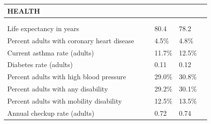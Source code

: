 \documentclass[9pt]{report}
\begin{document}
\newpage
\setlength{\tabcolsep}{.01in} %
\begin{tabular}{p{.10in}p{.10in}p{.10in}p{3.7in}>{\hfill}p{.85in}>{\hfill}p{.85in}>{\hfill}p{.85in}>{\hfill}p{.85in}p{0.1in}}
\multicolumn{9}{l}{\parbox{7.1in}{\raggedright{\large{\strut\textbf{HEALTH}\strut}}}} \\ 
\hline
\multicolumn{4}{l}{\parbox{3.5in}{\raggedright{\textbf{}}}} & \multicolumn{1}{r}{\parbox{.85in}{\strut\raggedleft{\textbf{}\strut}}} & \multicolumn{1}{r}{\parbox{.85in}{\strut\raggedleft{\textbf{}\strut}}} & \multicolumn{1}{r}{\parbox{.85in}{\strut{}}} & \multicolumn{1}{r}{\parbox{.85in}{\strut{}}} & \\ 
\multicolumn{9}{l}{} \\ 
\multicolumn{4}{l}{\parbox{3.6in}{\strut\raggedright{{Life expectancy in years}}\strut}} &  &  & 80.4 & 78.2 & \multicolumn{1}{l}{}  \\ 
\multicolumn{4}{l}{\parbox{3.6in}{\strut\raggedright{{Percent adults with coronary heart disease}}\strut}} &  &  & 4.5\% & 4.8\% & \multicolumn{1}{l}{}  \\ 
\multicolumn{4}{l}{\parbox{3.6in}{\strut\raggedright{{Current asthma rate (adults)}}\strut}} &  &  & 11.7\% & 12.5\% & \multicolumn{1}{l}{}  \\ 
\multicolumn{4}{l}{\parbox{3.6in}{\strut\raggedright{{Diabetes rate (adults)}}\strut}} &  &  & 0.11 & 0.12 & \multicolumn{1}{l}{}  \\ 
\multicolumn{4}{l}{\parbox{3.6in}{\strut\raggedright{{Percent adults with high blood pressure}}\strut}} &  &  & 29.0\% & 30.8\% & \multicolumn{1}{l}{}  \\ 
\multicolumn{4}{l}{\parbox{3.6in}{\strut\raggedright{{Percent adults with any disability}}\strut}} &  &  & 29.2\% & 30.1\% & \multicolumn{1}{l}{}  \\ 
\multicolumn{4}{l}{\parbox{3.6in}{\strut\raggedright{{Percent adults with mobility disability}}\strut}} &  &  & 12.5\% & 13.5\% & \multicolumn{1}{l}{}  \\ 
\multicolumn{4}{l}{\parbox{3.6in}{\strut\raggedright{{Annual checkup rate (adults)}}\strut}} &  &  & 0.72 & 0.74 & \multicolumn{1}{l}{}  \\ 

\end{tabular}
\end{document}
